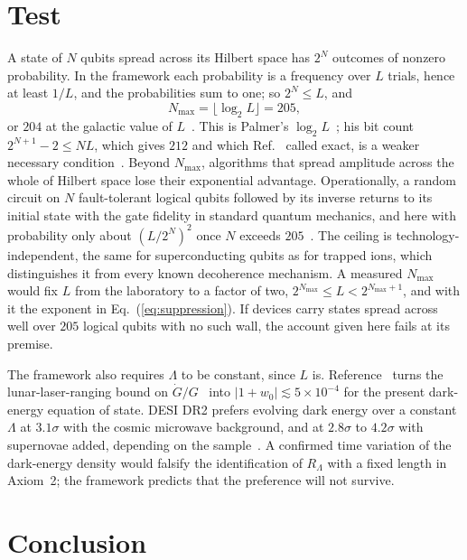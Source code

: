 \documentclass[aps,prd,twocolumn,superscriptaddress,nofootinbib,showkeys]{revtex4-2}
\begin{document}
\section{Test}
\label{sec:test}

A state of $N$ qubits spread across its Hilbert space has $2^N$ outcomes of nonzero probability. In the framework each probability is a frequency over $L$ trials, hence at least $1/L$, and the probabilities sum to one; so $2^N\le L$, and
\begin{equation}
N_{\max} = \lfloor\log_2 L\rfloor = 205,
\label{eq:nmax}
\end{equation}
or $204$ at the galactic value of $L$~\cite{korytko2026c}. This is Palmer's $\log_2 L$~\cite{palmer2026}; his bit count $2^{N+1}-2\le NL$, which gives $212$ and which Ref.~\cite{korytko2026} called exact, is a weaker necessary condition~\cite{korytko2026c}. Beyond $N_{\max}$, algorithms that spread amplitude across the whole of Hilbert space lose their exponential advantage. Operationally, a random circuit on $N$ fault-tolerant logical qubits followed by its inverse returns to its initial state with the gate fidelity in standard quantum mechanics, and here with probability only about $(L/2^N)^2$ once $N$ exceeds $205$~\cite{korytko2026c}. The ceiling is technology-independent, the same for superconducting qubits as for trapped ions, which distinguishes it from every known decoherence mechanism. A measured $N_{\max}$ would fix $L$ from the laboratory to a factor of two, $2^{N_{\max}}\le L<2^{N_{\max}+1}$, and with it the exponent in Eq.~(\ref{eq:suppression}). If devices carry states spread across well over $205$ logical qubits with no such wall, the account given here fails at its premise.

The framework also requires $\Lambda$ to be constant, since $L$ is. Reference~\cite{korytko2026} turns the lunar-laser-ranging bound on $\dot G/G$~\cite{hofmann2018} into $|1+w_0|\lesssim5\times10^{-4}$ for the present dark-energy equation of state. DESI DR2 prefers evolving dark energy over a constant $\Lambda$ at $3.1\sigma$ with the cosmic microwave background, and at $2.8\sigma$ to $4.2\sigma$ with supernovae added, depending on the sample~\cite{desi2025}. A confirmed time variation of the dark-energy density would falsify the identification of $R_\Lambda$ with a fixed length in Axiom~2; the framework predicts that the preference will not survive.

\section{Conclusion}
\end{document}
